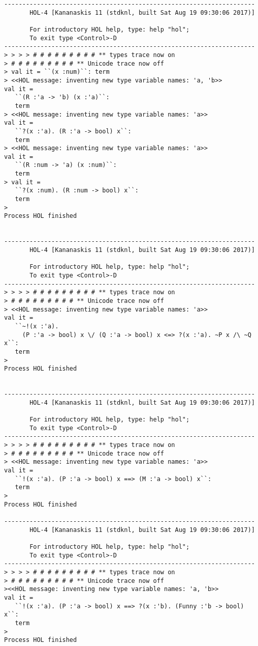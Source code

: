\documentclass{report}
\begin{document}
\begin{session}
\begin{scriptsize}
\begin{verbatim}
---------------------------------------------------------------------
       HOL-4 [Kananaskis 11 (stdknl, built Sat Aug 19 09:30:06 2017)]

       For introductory HOL help, type: help "hol";
       To exit type <Control>-D
---------------------------------------------------------------------
> > > > # # # # # # # # # ** types trace now on
> # # # # # # # # # ** Unicode trace now off
> val it = ``(x :num)``: term
> <<HOL message: inventing new type variable names: 'a, 'b>>
val it =
   ``(R :'a -> 'b) (x :'a)``:
   term
> <<HOL message: inventing new type variable names: 'a>>
val it =
   ``?(x :'a). (R :'a -> bool) x``:
   term
> <<HOL message: inventing new type variable names: 'a>>
val it =
   ``(R :num -> 'a) (x :num)``:
   term
> val it =
   ``?(x :num). (R :num -> bool) x``:
   term
> 
Process HOL finished


---------------------------------------------------------------------
       HOL-4 [Kananaskis 11 (stdknl, built Sat Aug 19 09:30:06 2017)]

       For introductory HOL help, type: help "hol";
       To exit type <Control>-D
---------------------------------------------------------------------
> > > > # # # # # # # # # ** types trace now on
> # # # # # # # # # ** Unicode trace now off
> <<HOL message: inventing new type variable names: 'a>>
val it =
   ``~!(x :'a).
     (P :'a -> bool) x \/ (Q :'a -> bool) x <=> ?(x :'a). ~P x /\ ~Q x``:
   term
> 
Process HOL finished


---------------------------------------------------------------------
       HOL-4 [Kananaskis 11 (stdknl, built Sat Aug 19 09:30:06 2017)]

       For introductory HOL help, type: help "hol";
       To exit type <Control>-D
---------------------------------------------------------------------
> > > > # # # # # # # # # ** types trace now on
> # # # # # # # # # ** Unicode trace now off
> <<HOL message: inventing new type variable names: 'a>>
val it =
   ``!(x :'a). (P :'a -> bool) x ==> (M :'a -> bool) x``:
   term
> 
Process HOL finished

---------------------------------------------------------------------
       HOL-4 [Kananaskis 11 (stdknl, built Sat Aug 19 09:30:06 2017)]

       For introductory HOL help, type: help "hol";
       To exit type <Control>-D
---------------------------------------------------------------------
> > > > # # # # # # # # # ** types trace now on
> # # # # # # # # # ** Unicode trace now off
><<HOL message: inventing new type variable names: 'a, 'b>>
val it =
   ``!(x :'a). (P :'a -> bool) x ==> ?(x :'b). (Funny :'b -> bool) x``:
   term
> 
Process HOL finished


\end{verbatim}
  \end{scriptsize}
\end{session}
\end{document}
